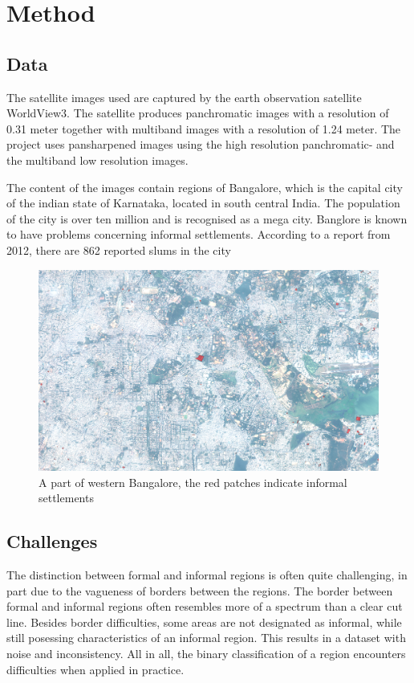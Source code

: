 
\section{Method}


\subsection{Data}


The satellite images used are captured by the earth observation satellite
WorldView3. The satellite produces panchromatic images with a resolution of
0.31 meter together with multiband images with a resolution of 1.24 meter. The
  project uses pansharpened images using the high resolution panchromatic- and
  the multiband low resolution images.

  The content of the images contain regions of Bangalore, which is the capital
  city of the indian state of Karnataka, located in south central India. The
  population of the city is over ten million and is recognised as a mega city.
  Banglore is known to have problems concerning informal settlements. According
  to a report from 2012, there are 862 reported slums in the city


\begin{figure}
  \includegraphics[width=\linewidth]{images/west-bangalore}
  \caption{A part of western Bangalore, the red patches indicate informal
  settlements}
  \label{fig:west-bangalore}
\end{figure}

\subsection{Challenges}
The distinction between formal and informal regions is often quite challenging,
in part due to the vagueness of borders between the regions. The border between
formal and informal regions often resembles more of a spectrum than a clear cut line.
Besides border difficulties, some areas are not designated as informal, while
still posessing characteristics of an informal region. This results in
a dataset with noise and inconsistency.  All in all, the binary classification
of a region encounters difficulties when applied in practice. 


